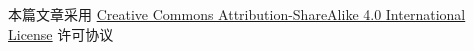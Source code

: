 本篇文章采用 \href{http://creativecommons.org/licenses/by-sa/4.0/}{Creative Commons
Attribution-ShareAlike 4.0 International License} 许可协议
\begin{center}\ccbysa\end{center}
